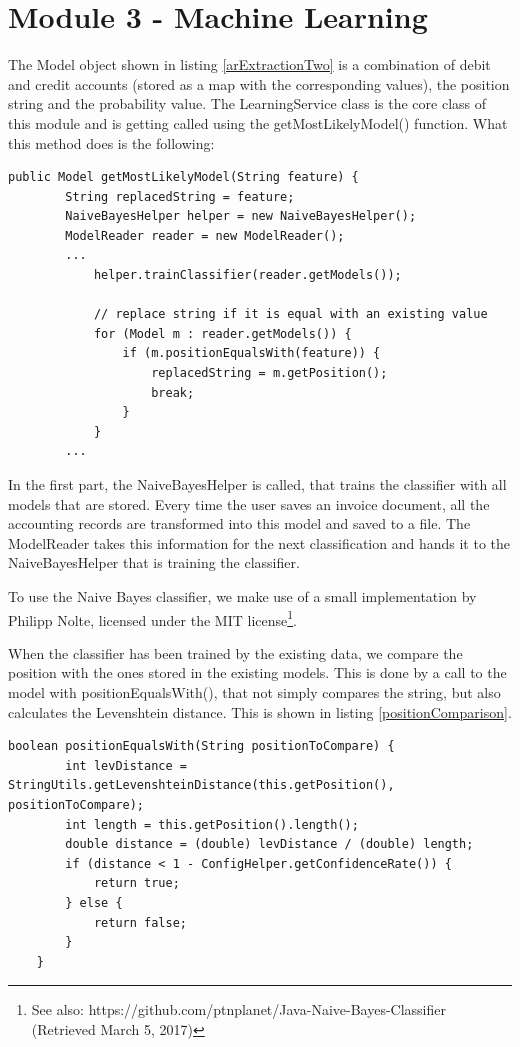 \section{Module 3 - Machine Learning}
\label{sec5.6}

The Model object shown in listing \ref{arExtractionTwo} is a combination of debit and credit accounts (stored as a map with the corresponding values), the position string and the probability value. The LearningService class is the core class of this module and is getting called using the getMostLikelyModel() function. What this method does is the following:

\begin{lstlisting}[caption={Search for the most likely model}]
 public Model getMostLikelyModel(String feature) {
        String replacedString = feature;
        NaiveBayesHelper helper = new NaiveBayesHelper();
        ModelReader reader = new ModelReader();
        ...
            helper.trainClassifier(reader.getModels());

            // replace string if it is equal with an existing value
            for (Model m : reader.getModels()) {
                if (m.positionEqualsWith(feature)) {
                    replacedString = m.getPosition();
                    break;
                }
            }
		...
\end{lstlisting}

In the first part, the NaiveBayesHelper is called, that trains the classifier with all models that are stored. Every time the user saves an invoice document, all the accounting records are transformed into this model and saved to a file. The ModelReader takes this information for the next classification and hands it to the NaiveBayesHelper that is training the classifier.


To use the Naive Bayes classifier, we make use of a small implementation by Philipp Nolte, licensed under the MIT license\footnote{See also: https://github.com/ptnplanet/Java-Naive-Bayes-Classifier (Retrieved March 5, 2017)}.

When the classifier has been trained by the existing data, we compare the position with the ones stored in the existing models. This is done by a call to the model with positionEqualsWith(), that not simply compares the string, but also calculates the Levenshtein distance. This is shown in listing \ref{positionComparison}.

\begin{lstlisting}[caption={Comparison between positions},label={positionComparison}]
    boolean positionEqualsWith(String positionToCompare) {
        int levDistance = StringUtils.getLevenshteinDistance(this.getPosition(), positionToCompare);
        int length = this.getPosition().length();
        double distance = (double) levDistance / (double) length;
        if (distance < 1 - ConfigHelper.getConfidenceRate()) {
            return true;
        } else {
            return false;
        }
    }
\end{lstlisting}

